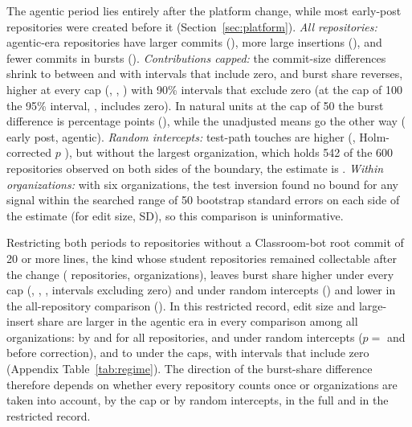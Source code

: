 \documentclass[acmsmall,screen,review,anonymous]{acmart}
\begin{document}
The agentic period lies entirely after the platform change, while most early-post repositories were created before it (Section~\ref{sec:platform}). \textit{All repositories:} agentic-era repositories have larger commits (), more large insertions (), and fewer commits in bursts (). \textit{Contributions capped:} the commit-size differences shrink to between  and  with intervals that include zero, and burst share reverses, higher at every cap (, , ) with 90\% intervals that exclude zero (at the cap of 100 the 95\% interval, , includes zero). In natural units at the cap of 50 the burst difference is  percentage points (), while the unadjusted means go the other way ( early post,  agentic). \textit{Random intercepts:} test-path touches are higher (, Holm-corrected $p$ ), but without the largest organization, which holds 542 of the 600 repositories observed on both sides of the boundary, the estimate is . \textit{Within organizations:} with six organizations, the test inversion found no bound for any signal within the searched range of 50 bootstrap standard errors on each side of the estimate (for edit size,  SD), so this comparison is uninformative.

Restricting both periods to repositories without a Classroom-bot root commit of 20 or more lines, the kind whose student repositories remained collectable after the change ( repositories,  organizations), leaves burst share higher under every cap (, , , intervals excluding zero) and under random intercepts () and lower in the all-repository comparison (). In this restricted record, edit size and large-insert share are larger in the agentic era in every comparison among all organizations: by  and  for all repositories,  and  under random intercepts ($p = $  and  before correction), and  to  under the caps, with intervals that include zero (Appendix Table~\ref{tab:regime}). The direction of the burst-share difference therefore depends on whether every repository counts once or organizations are taken into account, by the cap or by random intercepts, in the full and in the restricted record.
\end{document}
